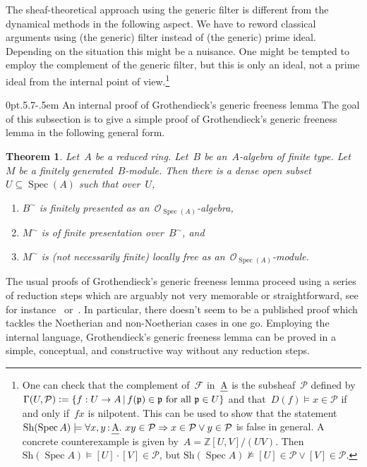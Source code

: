 \documentclass[10pt,reqno,a4paper]{amsbook}
\makeatletter
\theoremstyle{definition}
\theoremstyle{plain}
\newtheorem{thm}[defn]{Theorem}
\theoremstyle{remark}
\newcommand{\ZZ}{\mathbb{Z}}
\newcommand{\F}{\mathcal{F}}
\renewcommand{\O}{\mathcal{O}}
\renewcommand{\P}{\mathcal{P}}
\newcommand{\ppp}{\mathfrak{p}}
\let\oldul\ul
\renewcommand{\ul}[1]{\text{\oldul{$#1$}}}
\newcommand{\Sh}{\mathrm{Sh}}
\DeclareMathOperator{\Spec}{Spec}
\newcommand{\?}{\,{:}\,}
\renewcommand{\_}{\mathpunct{.}\,}
\newcommand{\stacksproject}[1]{\cite[{\href{https://stacks.math.columbia.edu/tag/#1}{Tag~#1}}]{stacks-project}}
\newcommand{\defeq}{\vcentcolon=}
\def\subsection{\@startsection{subsection}{2}%
  {0pt}{.5\linespacing\@plus.7\linespacing}{-.5em}%
  {\normalfont\bfseries}}
\makeatother
\begin{document}
The sheaf-theoretical approach using the generic filter is different from the
dynamical methods in the following aspect. We have to reword classical
arguments using (the generic) filter instead of (the generic) prime ideal.
Depending on the situation this might be a nuisance. One might be tempted to
employ the complement of the generic filter, but this is only an ideal, not a
prime ideal from the internal point of view.\footnote{One can check that the
complement of~$\F$ in~$\ul{A}$ is the subsheaf~$\P$ defined by~$\Gamma(U, \P)
\defeq \{ f : U \to A \,|\, \text{$f(\ppp) \in \ppp$ for all~$\ppp \in U$} \}$
and that~$D(f) \models x \in \P$ if and only if~$fx$ is nilpotent. This can be
used to show that the statement~$\Sh(\Spec A) \models \forall x,y\?\ul{A}\_ xy
\in \P \Rightarrow x \in \P \vee y \in \P$ is false in general. A concrete
counterexample is given by~$A = \ZZ[U,V]/(UV)$. Then~$\Sh(\Spec A) \models [U]
\cdot [V] \in \P$, but $\Sh(\Spec A) \not\models [U] \in \P \vee [V] \in \P$.}


\subsection{An internal proof of Grothendieck's generic freeness lemma}\label{sect:generic-freeness}
The goal of this subsection is to give a simple proof of Grothendieck's generic
freeness lemma in the following general form.

\begin{thm}\label{thm:generic-freeness}
Let~$A$ be a reduced ring. Let~$B$ be an~$A$-algebra of finite type.
Let~$M$ be a finitely generated~$B$-module. Then there is a dense open
subset~$U \subseteq \Spec(A)$ such that over~$U$,
\begin{enumerate}
\item $B^\sim$ is finitely presented as an~$\O_{\Spec(A)}$-algebra,
\item $M^\sim$ is of finite presentation over~$B^\sim$, and
\item $M^\sim$ is (not necessarily finite) locally free as an~$\O_{\Spec(A)}$-module.
\end{enumerate}
\end{thm}

The usual proofs of Grothendieck's generic freeness lemma proceed using a series
of reduction steps which are arguably not very memorable or
straightforward, see for instance~\stacksproject{051Q}
or~\cite{staats:generic-freeness}. In particular, there doesn't seem to be a
published proof which tackles the Noetherian and non-Noetherian cases in one go.
Employing the internal language, Grothendieck's generic freeness lemma can be
proved in a simple, conceptual, and constructive way without any reduction steps.
\end{document}

